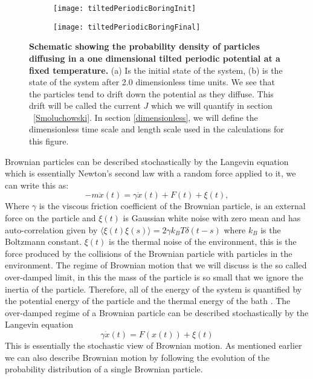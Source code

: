 \begin{figure}[tb]
	\begin{subfigure}{0.49\textwidth}
		\texttt{[image: tiltedPeriodicBoringInit]}
		\caption{\label{fig:Init}}
	\end{subfigure}
\begin{subfigure}{0.49\textwidth}
		\texttt{[image: tiltedPeriodicBoringFinal]}
		\caption{\label{fig:Final}}
\end{subfigure}
\caption{\textbf{Schematic showing the probability density of particles diffusing in a one dimensional tilted periodic potential at a fixed temperature.} (a) Is the initial state of the system, (b) is the state of the system after 2.0 dimensionless time units. We see that the particles tend to drift down the potential as they diffuse. This drift will be called the current $J$ which we will quantify in section ~\autoref{Smoluchowski}. In section \ref{dimensionless}, we will define the dimensionless time scale and length scale used in the calculations for this figure.}
\label{fig:Schematic}
\end{figure}

Brownian particles can be described stochastically by the Langevin equation which is essentially Newton's second law with a random force applied to it, we can write this as:
\begin{equation}
-m \ddot{x}(t) = \gamma \dot{x} (t) + F(t) + \xi(t), 
\end{equation}
Where $\gamma$ is the viscous friction coefficient of the Brownian particle, is an external force on the particle and $\xi(t)$ is Gaussian white noise with zero mean and has auto-correlation given by $\langle \xi(t) \xi(s) \rangle = 2 \gamma k_B T \delta(t - s)$ where $k_B$ is the Boltzmann constant. $\xi(t)$ is the thermal noise of the environment, this is the force produced by the collisions of the Brownian particle with particles in the environment.
The regime of Brownian motion that we will discuss is the so called over-damped limit, in this the mass of the particle is so small that we ignore the inertia of the particle. Therefore, all of the energy of the system is quantified by the potential energy of the particle and the thermal energy of the bath \cite{Streater1997,Streater1997a,Streater2000,Streater1997b}. The over-damped regime of a Brownian particle can be described stochastically by the Langevin equation 
\begin{equation}
	\gamma \dot x(t) = F(x(t)) + \xi(t)  \label{eqn:langevin}
\end{equation}
This is essentially the stochastic view of Brownian motion. As mentioned earlier we can also describe Brownian motion by following the evolution of the probability distribution of a single Brownian particle.

